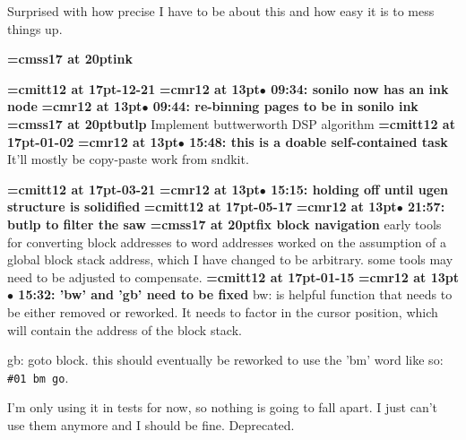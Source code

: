 Surprised with how precise I have to be about this and how easy it is to mess things up.
\par

{\medskip\noindent\bf\font\titlefont=cmss17 at 20pt\titlefont ink}\medskip

{\medskip\noindent\bf\font\titlefont=cmitt12 at 17pt-12-21}\medskip
{\smallskip\noindent\bf\font\titlefont=cmr12 at 13pt\titlefont $\bullet$ 09:34: sonilo now has an ink node}\smallskip
{\smallskip\noindent\bf\font\titlefont=cmr12 at 13pt\titlefont $\bullet$ 09:44: re-binning pages to be in sonilo ink}\smallskip
{}
{\medskip\noindent\bf\font\titlefont=cmss17 at 20pt\titlefont butlp}\medskip
Implement buttwerworth DSP algorithm
{\medskip\noindent\bf\font\titlefont=cmitt12 at 17pt-01-02}\medskip
{\smallskip\noindent\bf\font\titlefont=cmr12 at 13pt\titlefont $\bullet$ 15:48: this is a doable self-contained task}\smallskip
It'll mostly be copy-paste work from sndkit.
\par

{\medskip\noindent\bf\font\titlefont=cmitt12 at 17pt-03-21}\medskip
{\smallskip\noindent\bf\font\titlefont=cmr12 at 13pt\titlefont $\bullet$ 15:15: holding off until ugen structure is solidified}\smallskip
{\medskip\noindent\bf\font\titlefont=cmitt12 at 17pt-05-17}\medskip
{\smallskip\noindent\bf\font\titlefont=cmr12 at 13pt\titlefont $\bullet$ 21:57: butlp to filter the saw}\smallskip
{}
{\medskip\noindent\bf\font\titlefont=cmss17 at 20pt\titlefont fix block navigation}\medskip
early tools for converting block addresses to word addresses
worked on the assumption of a global block stack address,
which I have changed to be arbitrary.
some tools may need to be adjusted to compensate.
{\medskip\noindent\bf\font\titlefont=cmitt12 at 17pt-01-15}\medskip
{\smallskip\noindent\bf\font\titlefont=cmr12 at 13pt\titlefont $\bullet$ 15:32: 'bw' and 'gb' need to be fixed}\smallskip
bw: is helpful function that needs to be either removed or reworked. It needs to factor in the cursor position, which will contain the address of the block stack.
\par

gb: goto block. this should eventually be reworked to use the 'bm' word like so: {\tt \#01 bm go}.
\par

I'm only using it in tests for now, so nothing is going to fall apart. I just can't use them anymore and I should be fine. Deprecated.
\par

